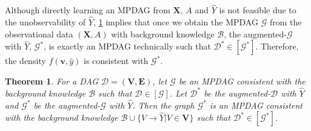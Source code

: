 \documentclass{article} %
\newtheorem{theorem}{Theorem}[section]
\begin{document}

Although directly learning an MPDAG from $\mathbf{X}$, $A$ and $\hat{Y}$ is not feasible due to the unobservability of $\hat{Y}$, \cref{theo: mpdag} implies that once we obtain the MPDAG $\mathcal{G}$ from the observational data $(\mathbf{X}, A)$ with background knowledge $\mathcal{B}$, the augmented-$\mathcal{G}$ with $\hat{Y}$, $\mathcal{G^{*}}$, is exactly an MPDAG technically such that $\mathcal{D^{*}} \in [\mathcal{G^{*}}]$. Therefore, the density $f(\mathbf{v}, \hat{y})$ is consistent with $\mathcal{G^*}$. 


\begin{theorem}\label{theo: mpdag}
    For a DAG $\mathcal{D}=(\mathbf{V}, \mathbf{E})$, let $\mathcal{G}$ be an MPDAG consistent with the background knowledge $\mathcal{B}$ such that $\mathcal{D} \in  [\mathcal{G}]$. Let $\mathcal{D^{*}}$ be the augmented-$\mathcal{D}$ with $\hat{Y}$ and $\mathcal{G^{*}}$ be the augmented-$\mathcal{G}$ with $\hat{Y}$. Then the graph $\mathcal{G^{*}}$ is an MPDAG consistent with the background knowledge $\mathcal{B} \cup \{V \rightarrow \hat{Y}|V \in \mathbf{V}\}$ such that $\mathcal{D^{*}} \in [\mathcal{G^{*}}]$.
\end{theorem}

\end{document}
